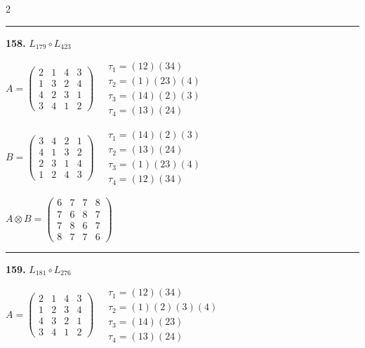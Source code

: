 \begin{multicols}{2}
\vspace{0.3em}
\hrule
\vspace{0.3em}

\noindent\textbf{158.} $L_{179} \circ L_{423}$

$A = \begin{pmatrix} 2 & 1 & 4 & 3 \\ 1 & 3 & 2 & 4 \\ 4 & 2 & 3 & 1 \\ 3 & 4 & 1 & 2 \end{pmatrix} \quad \begin{matrix} \tau_{1}=(1 2)(3 4) \\ \tau_{2}=(1)(2 3)(4) \\ \tau_{3}=(1 4)(2)(3) \\ \tau_{4}=(1 3)(2 4) \end{matrix}$

$B = \begin{pmatrix} 3 & 4 & 2 & 1 \\ 4 & 1 & 3 & 2 \\ 2 & 3 & 1 & 4 \\ 1 & 2 & 4 & 3 \end{pmatrix} \quad \begin{matrix} \tau_{1}=(1 4)(2)(3) \\ \tau_{2}=(1 3)(2 4) \\ \tau_{3}=(1)(2 3)(4) \\ \tau_{4}=(1 2)(3 4) \end{matrix}$

$A \otimes B = \begin{pmatrix} 6 & 7 & 7 & 8 \\ 7 & 6 & 8 & 7 \\ 7 & 8 & 6 & 7 \\ 8 & 7 & 7 & 6 \end{pmatrix}$

\vspace{0.3em}
\hrule
\vspace{0.3em}

\noindent\textbf{159.} $L_{181} \circ L_{276}$

$A = \begin{pmatrix} 2 & 1 & 4 & 3 \\ 1 & 2 & 3 & 4 \\ 4 & 3 & 2 & 1 \\ 3 & 4 & 1 & 2 \end{pmatrix} \quad \begin{matrix} \tau_{1}=(1 2)(3 4) \\ \tau_{2}=(1)(2)(3)(4) \\ \tau_{3}=(1 4)(2 3) \\ \tau_{4}=(1 3)(2 4) \end{matrix}$


\end{multicols}
